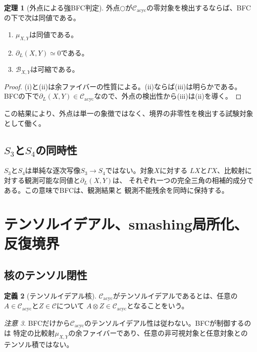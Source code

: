 \documentclass[11pt,a4paper]{ltjsarticle}
\theoremstyle{definition}
\newtheorem{definition}{定義}[section]
\newtheorem{theorem}[definition]{定理}
\theoremstyle{remark}
\newtheorem{remark}[definition]{注意}
\newcommand{\C}{\mathcal{C}}
\newcommand{\Cacyc}{\mathcal{C}_{\mathrm{acyc}}}
\newcommand{\Boundary}{\partial_L}
\newcommand{\Residual}{\Gamma}
\begin{document}
\begin{theorem}[外点による強BFC判定]
外点$\bigcirc$が$\Cacyc$の零対象を検出するならば、BFCの下で次は同値である。
\begin{enumerate}[label=(\roman*)]
 \item $\mu_{X,Y}$は同値である。
 \item $\Boundary(X,Y)\simeq0$である。
 \item $\mathcal{B}_{X,Y}$は可縮である。
\end{enumerate}
\end{theorem}

\begin{proof}
(i)と(ii)は余ファイバーの性質による。(ii)ならば(iii)は明らかである。
BFCの下で$\Boundary(X,Y)\in\Cacyc$なので、外点の検出性から(iii)は(ii)を導く。
\end{proof}

この結果により、外点は単一の象徴ではなく、境界の非零性を検出する試験対象として働く。

\subsection{\texorpdfstring{$S_3$と$S_4$}{S3とS4}の同時性}

$S_3$と$S_4$は単純な逐次写像$S_3\to S_4$ではない。対象$X$に対する
$LX$と$\Residual X$、比較射に対する観測可能な同値と$\Boundary(X,Y)$は、
それぞれ一つの完全三角の相補的成分である。この意味でBFCは、観測結果と
観測不能残余を同時に保持する。

\section{テンソルイデアル、smashing局所化、反復境界}

\subsection{核のテンソル閉性}

\begin{definition}[テンソルイデアル核]
$\Cacyc$がテンソルイデアルであるとは、任意の$A\in\Cacyc$と$Z\in\C$について
$A\otimes Z\in\Cacyc$となることをいう。
\end{definition}

\begin{remark}
BFCだけから$\Cacyc$のテンソルイデアル性は従わない。BFCが制御するのは
特定の比較射$\mu_{X,Y}$の余ファイバーであり、任意の非可視対象と任意対象との
テンソル積ではない。
\end{remark}
\end{document}
